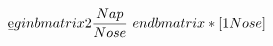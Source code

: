 \documentclass[preview]{standalone}
\begin{document}
\begin{align*}
\b e gin{bmatrix}   2   \frac{ N ap}{ N o s e }   \ e nd{bmatrix}   *   [ 1   N o s e ]
\end{align*}
\end{document}

